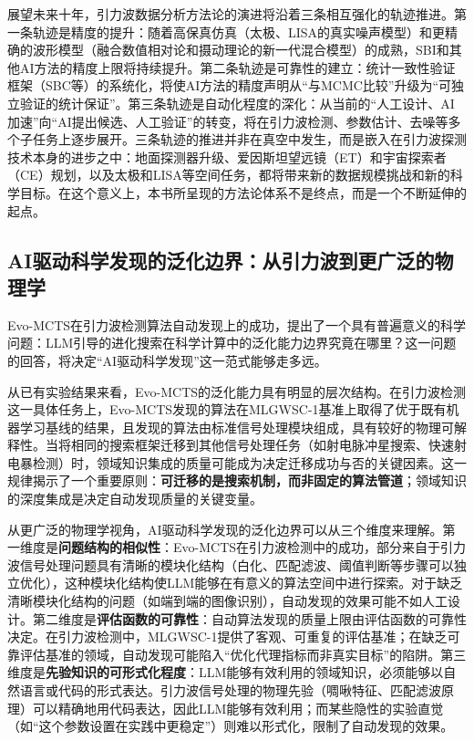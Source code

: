 展望未来十年，引力波数据分析方法论的演进将沿着三条相互强化的轨迹推进。第一条轨迹是精度的提升：随着高保真仿真（太极、LISA的真实噪声模型）和更精确的波形模型（融合数值相对论和摄动理论的新一代混合模型）的成熟，SBI和其他AI方法的精度上限将持续提升。第二条轨迹是可靠性的建立：统计一致性验证框架（SBC等）的系统化，将使AI方法的精度声明从“与MCMC比较”升级为“可独立验证的统计保证”。第三条轨迹是自动化程度的深化：从当前的“人工设计、AI加速”向“AI提出候选、人工验证”的转变，将在引力波检测、参数估计、去噪等多个子任务上逐步展开。三条轨迹的推进并非在真空中发生，而是嵌入在引力波探测技术本身的进步之中：地面探测器升级、爱因斯坦望远镜（ET）和宇宙探索者（CE）规划，以及太极和LISA等空间任务，都将带来新的数据规模挑战和新的科学目标。在这个意义上，本书所呈现的方法论体系不是终点，而是一个不断延伸的起点。

\subsection{AI驱动科学发现的泛化边界：从引力波到更广泛的物理学}

Evo-MCTS在引力波检测算法自动发现上的成功，提出了一个具有普遍意义的科学问题：LLM引导的进化搜索在科学计算中的泛化能力边界究竟在哪里？这一问题的回答，将决定“AI驱动科学发现”这一范式能够走多远。

从已有实验结果来看，Evo-MCTS的泛化能力具有明显的层次结构。在引力波检测这一具体任务上，Evo-MCTS发现的算法在MLGWSC-1基准上取得了优于既有机器学习基线的结果，且发现的算法由标准信号处理模块组成，具有较好的物理可解释性。当将相同的搜索框架迁移到其他信号处理任务（如射电脉冲星搜索、快速射电暴检测）时，领域知识集成的质量可能成为决定迁移成功与否的关键因素。这一规律揭示了一个重要原则：\textbf{可迁移的是搜索机制，而非固定的算法管道}；领域知识的深度集成是决定自动发现质量的关键变量。

从更广泛的物理学视角，AI驱动科学发现的泛化边界可以从三个维度来理解。第一维度是\textbf{问题结构的相似性}：Evo-MCTS在引力波检测中的成功，部分来自于引力波信号处理问题具有清晰的模块化结构（白化、匹配滤波、阈值判断等步骤可以独立优化），这种模块化结构使LLM能够在有意义的算法空间中进行探索。对于缺乏清晰模块化结构的问题（如端到端的图像识别），自动发现的效果可能不如人工设计。第二维度是\textbf{评估函数的可靠性}：自动算法发现的质量上限由评估函数的可靠性决定。在引力波检测中，MLGWSC-1提供了客观、可重复的评估基准；在缺乏可靠评估基准的领域，自动发现可能陷入“优化代理指标而非真实目标”的陷阱。第三维度是\textbf{先验知识的可形式化程度}：LLM能够有效利用的领域知识，必须能够以自然语言或代码的形式表达。引力波信号处理的物理先验（啁啾特征、匹配滤波原理）可以精确地用代码表达，因此LLM能够有效利用；而某些隐性的实验直觉（如“这个参数设置在实践中更稳定”）则难以形式化，限制了自动发现的效果。

